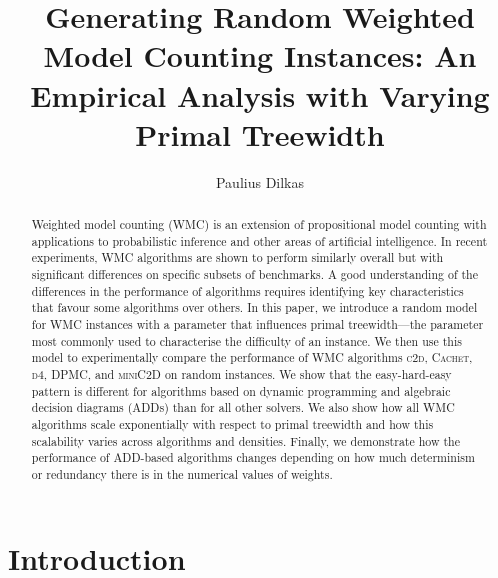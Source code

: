 \documentclass[runningheads]{llncs}
\begin{document}
\title{Generating Random Weighted Model Counting Instances: An Empirical Analysis with Varying Primal Treewidth}

\author{Paulius Dilkas}


\maketitle

\begin{abstract}
  Weighted model counting (\textsf{WMC}) is an extension of propositional model
  counting with applications to probabilistic inference and other areas of
  artificial intelligence. In recent experiments, \textsf{WMC} algorithms are
  shown to perform similarly overall but with significant differences on
  specific subsets of benchmarks. A good understanding of the differences in the
  performance of algorithms requires identifying key characteristics that favour
  some algorithms over others. In this paper, we introduce a random model for
  \textsf{WMC} instances with a parameter that influences primal treewidth---the
  parameter most commonly used to characterise the difficulty of an instance. We
  then use this model to experimentally compare the performance of \textsf{WMC}
  algorithms \textsc{c2d}, \textsc{Cachet}, \textsc{d4}, \textsc{DPMC}, and
  \textsc{miniC2D} on random instances. We show that the easy-hard-easy pattern
  is different for algorithms based on dynamic programming and algebraic
  decision diagrams (ADDs) than for all other solvers. We also show how all
  \textsf{WMC} algorithms scale exponentially with respect to primal treewidth
  and how this scalability varies across algorithms and densities. Finally, we
  demonstrate how the performance of ADD-based algorithms changes depending on
  how much determinism or redundancy there is in the numerical values of
  weights.
\end{abstract}

\section{Introduction}
\end{document}
